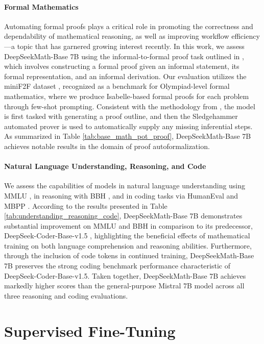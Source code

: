 \begin{itemize}[topsep=0pt]
\paragraph{Formal Mathematics}

Automating formal proofs plays a critical role in promoting the correctness and dependability of mathematical reasoning, as well as improving workflow efficiency—a topic that has garnered growing interest recently. In this work, we assess DeepSeekMath-Base 7B using the informal-to-formal proof task outlined in \citep{dsp_proof}, which involves constructing a formal proof given an informal statement, its formal representation, and an informal derivation. Our evaluation utilizes the miniF2F dataset \citep{minif2f}, recognized as a benchmark for Olympiad-level formal mathematics, where we produce Isabelle-based formal proofs for each problem through few-shot prompting. Consistent with the methodology from \cite{dsp_proof}, the model is first tasked with generating a proof outline, and then the Sledgehammer automated prover \citep{sledgehammer} is used to automatically supply any missing inferential steps. As summarized in Table \ref{tab:base_math_pot_proof}, DeepSeekMath-Base 7B achieves notable results in the domain of proof autoformalization.

\paragraph{Natural Language Understanding, Reasoning, and Code}

We assess the capabilities of models in natural language understanding using MMLU \citep{mmlu}, in reasoning with BBH \citep{bbh}, and in coding tasks via HumanEval \citep{codex} and MBPP \citep{mbpp}. According to the results presented in Table \ref{tab:understanding_reasoning_code}, DeepSeekMath-Base 7B demonstrates substantial improvement on MMLU and BBH in comparison to its predecessor, DeepSeek-Coder-Base-v1.5 \citep{deepseek-coder}, highlighting the beneficial effects of mathematical training on both language comprehension and reasoning abilities. Furthermore, through the inclusion of code tokens in continued training, DeepSeekMath-Base 7B preserves the strong coding benchmark performance characteristic of DeepSeek-Coder-Base-v1.5. Taken together, DeepSeekMath-Base 7B achieves markedly higher scores than the general-purpose Mistral 7B model \citep{mistral} across all three reasoning and coding evaluations.

\section{Supervised Fine-Tuning}


\end{itemize}
